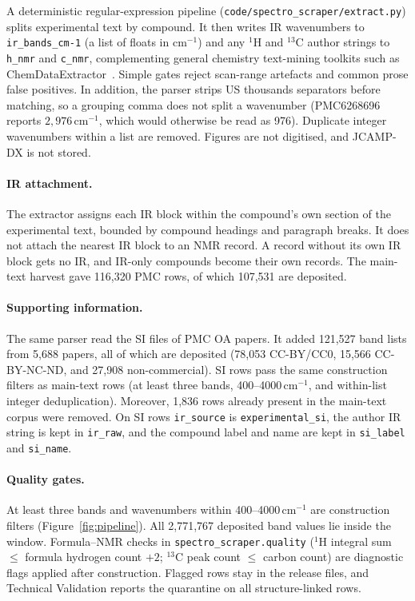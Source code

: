 \documentclass[pdflatex,sn-nature]{sn-jnl}
\begin{document}
A deterministic regular-expression pipeline (\texttt{code/spectro\_scraper/extract.py})
splits experimental text by compound.
It then writes IR wavenumbers to \texttt{ir\_bands\_cm-1} (a list of floats in cm$^{-1}$)
and any $^{1}$H and $^{13}$C author strings to \texttt{h\_nmr} and \texttt{c\_nmr},
complementing general chemistry text-mining toolkits such as
ChemDataExtractor~\citep{swain2016chemdataextractor}.
Simple gates reject scan-range artefacts and common prose false positives.
In addition, the parser strips US thousands separators before matching, so a grouping
comma does not split a wavenumber (PMC6268696 reports $2{,}976$\,cm$^{-1}$, which would
otherwise be read as 976).
Duplicate integer wavenumbers within a list are removed.
Figures are not digitised, and JCAMP-DX is not stored.

\paragraph{IR attachment.}
The extractor assigns each IR block within the compound's own section of the
experimental text, bounded by compound headings and paragraph breaks.
It does not attach the nearest IR block to an NMR record.
A record without its own IR block gets no IR, and IR-only compounds become their own
records.
The main-text harvest gave 116,320 PMC rows, of which 107,531 are deposited.

\paragraph{Supporting information.}
The same parser read the SI files of PMC OA papers.
It added 121,527 band lists from 5,688 papers, all of which are deposited (78,053 CC-BY/CC0, 15,566 CC-BY-NC-ND, and
27,908 non-commercial).
SI rows pass the same construction filters as main-text rows (at least three bands,
400--4000\,cm$^{-1}$, and within-list integer deduplication).
Moreover, 1,836 rows already present in the main-text corpus were removed.
On SI rows \texttt{ir\_source} is \texttt{experimental\_si}, the author IR string is
kept in \texttt{ir\_raw}, and the compound label and name are kept in
\texttt{si\_label} and \texttt{si\_name}.

\paragraph{Quality gates.}
At least three bands and wavenumbers within 400--4000\,cm$^{-1}$ are construction
filters (Figure~\ref{fig:pipeline}).
All 2,771,767 deposited band values lie inside the window.
Formula--NMR checks in \texttt{spectro\_scraper.quality} ($^{1}$H integral sum
$\leq$ formula hydrogen count $+2$; $^{13}$C peak count $\leq$ carbon count) are
diagnostic flags applied after construction.
Flagged rows stay in the release files, and Technical Validation reports the
quarantine on all structure-linked rows.
\end{document}
